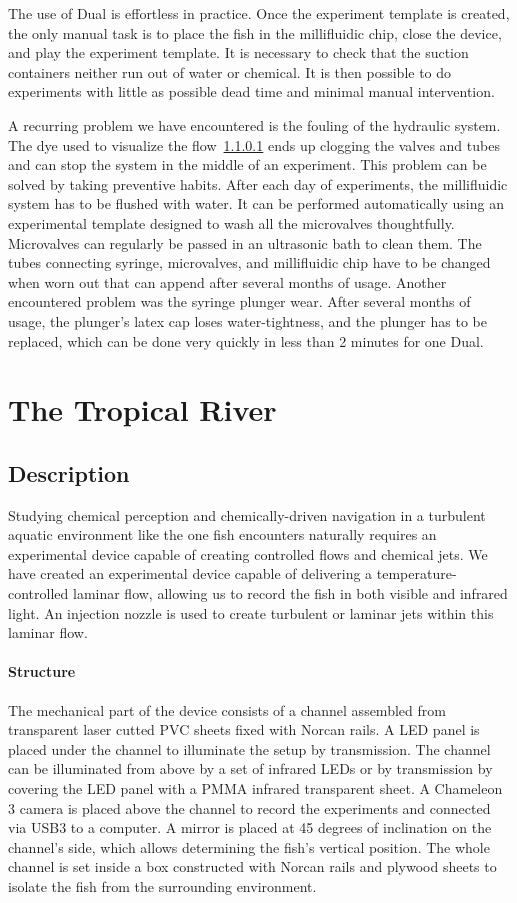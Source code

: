   The use of Dual is effortless in practice. Once the experiment template is created, the only manual task is to place the fish in the millifluidic chip, close the device, and play the experiment template. It is necessary to check that the suction containers neither run out of water or chemical. It is then possible to do experiments with little as possible dead time and minimal manual intervention.

  A recurring problem we have encountered is the fouling of the hydraulic system. The dye used to visualize the flow~\ref{} ends up clogging the valves and tubes and can stop the system in the middle of an experiment. This problem can be solved by taking preventive habits. After each day of experiments, the millifluidic system has to be flushed with water. It can be performed automatically using an experimental template designed to wash all the microvalves thoughtfully. Microvalves can regularly be passed in an ultrasonic bath to clean them. The tubes connecting syringe, microvalves, and millifluidic chip have to be changed when worn out that can append after several months of usage. Another encountered problem was the syringe plunger wear. After several months of usage, the plunger's latex cap loses water-tightness, and the plunger has to be replaced, which can be done very quickly in less than 2 minutes for one Dual.

  \section{The Tropical River}
  \subsection{Description}
  Studying chemical perception and chemically-driven navigation in a turbulent aquatic environment like the one fish encounters naturally requires an experimental device capable of creating controlled flows and chemical jets. We have created an experimental device capable of delivering a temperature-controlled laminar flow, allowing us to record the fish in both visible and infrared light. An injection nozzle is used to create turbulent or laminar jets within this laminar flow.

  \paragraph{Structure}
  The mechanical part of the device consists of a channel assembled from transparent laser cutted PVC sheets fixed with Norcan rails. A LED panel is placed under the channel to illuminate the setup by transmission. The channel can be illuminated from above by a set of infrared LEDs or by transmission by covering the LED panel with a PMMA infrared transparent sheet. A Chameleon 3 camera is placed above the channel to record the experiments and connected via USB3 to a computer. A mirror is placed at 45 degrees of inclination on the channel's side, which allows determining the fish's vertical position. The whole channel is set inside a box constructed with Norcan rails and plywood sheets to isolate the fish from the surrounding environment.

